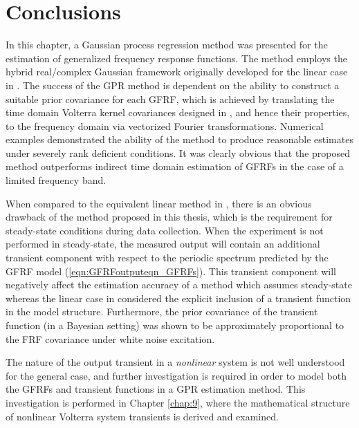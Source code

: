 \section{Conclusions}
\label{sec:Conc_GFRFs}

In this chapter, a Gaussian process regression method was presented for the estimation of generalized frequency response functions. The method employs the hybrid real/complex Gaussian framework originally developed for the linear case in \cite{Lataire2016}. The success of the GPR method is dependent on the ability to construct a suitable prior covariance for each GFRF, which is achieved by translating the time domain Volterra kernel covariances designed in \cite{Birpoutsoukis2017}, and hence their properties, to the frequency domain via vectorized Fourier transformations. Numerical examples demonstrated the ability of the method to produce reasonable estimates under severely rank deficient conditions. It was clearly obvious that the proposed method outperforms indirect time domain estimation of GFRFs in the case of a limited frequency band.

When compared to the equivalent linear method in \cite{Lataire2016}, there is an obvious drawback of the method proposed in this thesis, which is the requirement for steady-state conditions during data collection. When the experiment is not performed in steady-state, the measured output will contain an additional transient component with respect to the periodic spectrum predicted by the GFRF model (\ref{eqn:GFRFoutputeqn_GFRFs}). This transient component will negatively affect the estimation accuracy of a method which assumes steady-state whereas the linear case in \cite{Lataire2016} considered the explicit inclusion of a transient function in the model structure. Furthermore, the prior covariance of the transient function (in a Bayesian setting) was shown to be approximately proportional to the FRF covariance under white noise excitation.

The nature of the output transient in a \emph{nonlinear} system is not well understood for the general case, and further investigation is required in order to model both the GFRFs and transient functions in a GPR estimation method. This investigation is performed in Chapter \ref{chap:9}, where the mathematical structure of nonlinear Volterra system transients is derived and examined.